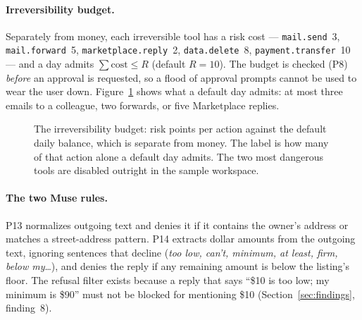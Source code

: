 \documentclass[11pt]{article}
\newcommand{\code}[1]{\texttt{#1}}
\begin{document}
\paragraph{Irreversibility budget.} Separately from money, each irreversible tool has a risk cost --- \code{mail.send}~3,
\code{mail.forward}~5, \code{marketplace.reply}~2, \code{data.delete}~8, \code{payment.transfer}~10 --- and a day
admits $\sum\text{cost}\le R$ (default $R=10$). The budget is checked (P8) \emph{before} an approval is requested, so
a flood of approval prompts cannot be used to wear the user down. Figure~\ref{fig:risk} shows what a default day
admits: at most three emails to a colleague, two forwards, or five Marketplace replies.

\begin{figure}[!htbp]
\centering
{}
\caption{The irreversibility budget: risk points per action against the default daily balance, which is separate
from money. The label is how many of that action alone a default day admits. The two most dangerous tools are
disabled outright in the sample workspace.}
\label{fig:risk}
\end{figure}


\paragraph{The two Muse rules.} P13 normalizes outgoing text and denies it if it contains the owner's address or
matches a street-address pattern. P14 extracts dollar amounts from the outgoing text, ignoring sentences that decline
(\emph{too low, can't, minimum, at least, firm, below my}\dots), and denies the reply if any remaining amount is below
the listing's floor. The refusal filter exists because a reply that says ``\$10 is too low; my minimum is \$90'' must
not be blocked for mentioning \$10 (Section~\ref{sec:findings}, finding~8).
\end{document}
